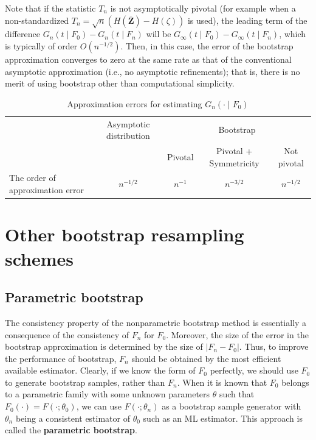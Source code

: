 \documentclass[10.5pt, A4paper, openany, uplatex]{book}
\newcommand{\mbf}{\mathbf}
\renewcommand{\bar}{\overline}
\numberwithin{equation}{section}
\begin{document}
Note that if the statistic $T_n$ is not asymptotically pivotal (for example when a non-standardized $T_n = \sqrt{n}(H(\bar{\mbf{Z}}) - H(\zeta))$ is used), the leading term of the difference $G_n(t \mid F_0) - G_n(t \mid F_n)$ will be $G_\infty(t \mid F_0) - G_\infty(t \mid F_n)$, which is typically of order $O(n^{-1/2})$.
Then, in this case, the error of the bootstrap approximation converges to zero at the same rate as that of the conventional asymptotic approximation (i.e., no asymptotic refinements); that is, there is no merit of using bootstrap other than computational simplicity.

\begin{table}[h]
	\caption{Approximation errors for estimating $G_n(\cdot \mid F_0)$}
	\begin{tabular}{l|cccc}
		\hline
	& Asymptotic distribution     & \multicolumn{3}{c}{Bootstrap}    \\
    &                             & Pivotal                   & Pivotal + Symmetricity         & Not pivotal                 \\
		\hline
	The order of approximation error & $n^{-1/2}$ & $n^{-1}$ & $n^{-3/2}$ & $n^{-1/2}$ \\
		\hline
	\end{tabular}
\end{table}

\section{Other bootstrap resampling schemes}
\subsection{Parametric bootstrap}

The consistency property of the nonparametric bootstrap method is essentially a consequence of the consistency of $F_n$ for $F_0$.
Moreover, the size of the error in the bootstrap approximation is determined by the size of $|F_n - F_0|$.
Thus, to improve the performance of bootstrap, $F_n$ should be obtained by the most efficient available estimator.
Clearly, if we know the form of $F_0$ perfectly, we should use $F_0$ to generate bootstrap samples, rather than $F_n$.
When it is known that $F_0$ belongs to a parametric family with some unknown parameters $\theta$ such that $F_0(\cdot) = F(\cdot ; \theta_0)$, we can use $F(\cdot ; \theta_n)$ as a bootstrap sample generator with $\theta_n$ being a consistent estimator of $\theta_0$ such as an ML estimator.
This approach is called the \textbf{parametric bootstrap}.
\end{document}
